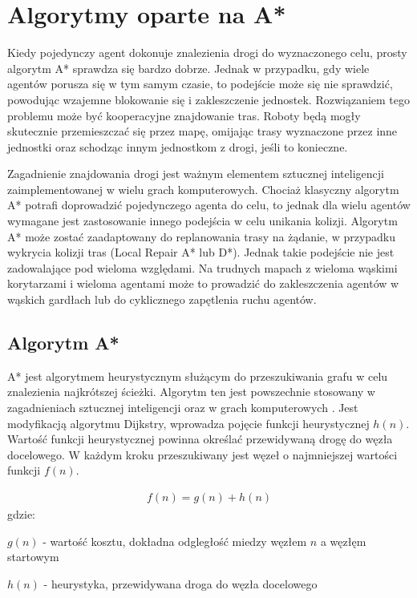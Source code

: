 \chapter{Algorytmy oparte na A*}
\label{ch:astar}

Kiedy pojedynczy agent dokonuje znalezienia drogi do wyznaczonego celu, prosty algorytm A* sprawdza się bardzo dobrze. Jednak w przypadku, gdy wiele agentów porusza się w tym samym czasie, to podejście może się nie sprawdzić, powodując wzajemne blokowanie się i zakleszczenie jednostek. Rozwiązaniem tego problemu może być kooperacyjne znajdowanie tras. Roboty będą mogły skutecznie przemieszczać się przez mapę, omijając trasy wyznaczone przez inne jednostki oraz schodząc innym jednostkom z drogi, jeśli to konieczne. \cite{cooppath}

Zagadnienie znajdowania drogi jest ważnym elementem sztucznej inteligencji zaimplementowanej w wielu grach komputerowych. Chociaż klasyczny algorytm A* potrafi doprowadzić pojedynczego agenta do celu, to jednak dla wielu agentów wymagane jest zastosowanie innego podejścia w celu unikania kolizji. Algorytm A* może zostać zaadaptowany do replanowania trasy na żądanie, w przypadku wykrycia kolizji tras (Local Repair A* lub D*). Jednak takie podejście nie jest zadowalające pod wieloma względami. Na trudnych mapach z wieloma wąskimi korytarzami i wieloma agentami może to prowadzić do zakleszczenia agentów w wąskich gardłach lub do cyklicznego zapętlenia ruchu agentów. \cite{cooppath}

\section{Algorytm A*}
A* jest algorytmem heurystycznym służącym do przeszukiwania grafu w celu znalezienia najkrótszej ścieżki. Algorytm ten jest powszechnie stosowany w zagadnieniach sztucznej inteligencji oraz w grach komputerowych \cite{mit_astar}. Jest modyfikacją algorytmu Dijkstry, wprowadza pojęcie funkcji heurystycznej $h(n)$. Wartość funkcji heurystycznej powinna określać przewidywaną drogę do węzła docelowego. W każdym kroku przeszukiwany jest węzeł o najmniejszej wartości funkcji $f(n)$.

\begin{gather}
 	f(n) = g(n) + h(n)
 	\label{eq_astar} 
\end{gather}
 gdzie:

 $g(n)$ - wartość kosztu, dokładna odgległość miedzy węzłem $n$ a węzłęm startowym

 $h(n)$ - heurystyka, przewidywana droga do węzła docelowego


